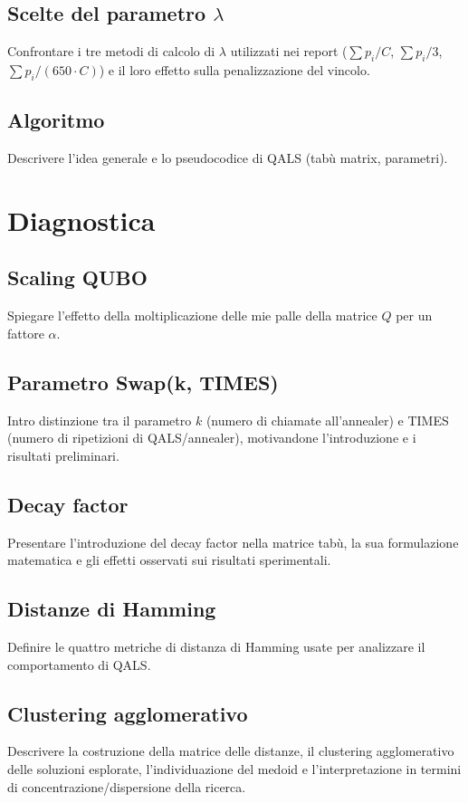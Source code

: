 \documentclass[12pt,a4paper,oneside]{report}
\begin{document}
\section{Scelte del parametro \(\lambda\)}
Confrontare i tre metodi di calcolo di \(\lambda\) utilizzati nei report
(\(\sum p_i / C\), \(\sum p_i / 3\), \(\sum p_i / (650 \cdot C)\)) e il loro effetto
sulla penalizzazione del vincolo.

\section{Algoritmo}
Descrivere l'idea generale e lo pseudocodice di QALS (tabù matrix, parametri).
 
\chapter{Diagnostica}
 
\section{Scaling QUBO}
Spiegare l'effetto della moltiplicazione delle mie palle della matrice \(Q\) per un fattore
\(\alpha\).
 
\section{Parametro Swap(k, TIMES)}
Intro distinzione tra il parametro \(k\) (numero di chiamate
all'annealer) e TIMES (numero di ripetizioni di QALS/annealer), motivandone
l'introduzione e i risultati preliminari.

\section{Decay factor}
Presentare l'introduzione del decay factor nella matrice tabù, la sua
formulazione matematica e gli effetti osservati sui risultati sperimentali.

\section{Distanze di Hamming}
Definire le quattro metriche di distanza di Hamming usate per analizzare il
comportamento di QALS.
 
\section{Clustering agglomerativo}
Descrivere la costruzione della matrice delle distanze, il clustering
agglomerativo delle soluzioni esplorate, l'individuazione del medoid e
l'interpretazione in termini di concentrazione/dispersione della ricerca.
 
\end{document}
